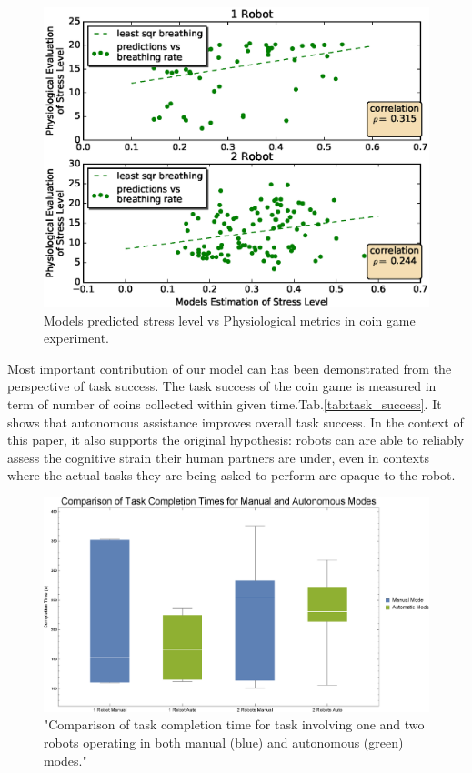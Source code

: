\documentclass{sig-alternate}
\begin{document}
\begin{figure}  
\centering
\includegraphics[width=.5\textwidth]{prediction_vs_b_p_2.eps}
\caption{Models predicted stress level vs Physiological metrics in coin game experiment.}
\label{fig:pred_phy}
\end{figure}

Most important contribution of our model can has been demonstrated from the perspective of task success. The task
success of the coin game is measured in term of number of coins collected within given time.Tab.\ref{tab:task_success}.
It shows that autonomous assistance improves overall task success. In the context of this paper, it also supports the
original hypothesis: robots can are able to reliably assess the cognitive strain their human partners are under, even in
contexts where the actual tasks they are being asked to perform are opaque to the robot.

\begin{figure}
\centering
\includegraphics[width=.5\textwidth]{BoxWiskerTimesCompMaualVsAuto.eps}
\caption{"Comparison of task completion time for task involving one and two robots operating in both manual (blue) and autonomous (green) modes."}
\label{fig:BoxWiskersTimeComp}
\end{figure}
\end{document}
